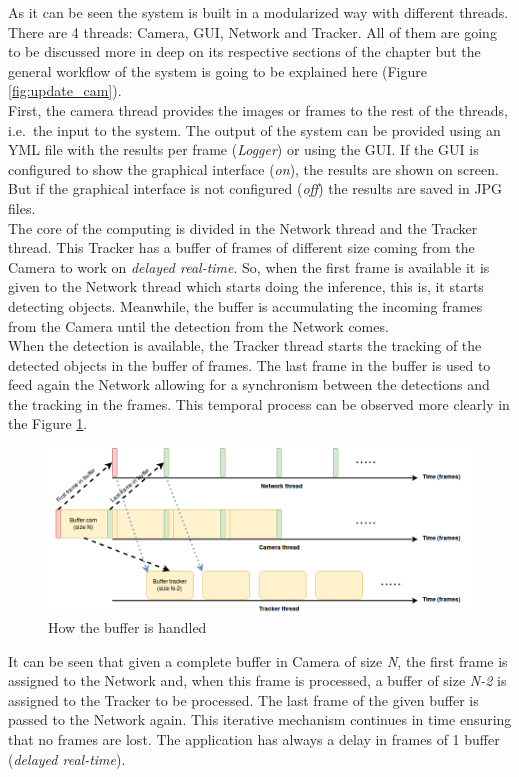 As it can be seen the system is built in a modularized way with different threads. There are 4 threads: Camera, GUI, Network and Tracker. All of them are going to be discussed more in deep on its respective sections of the chapter but the general workflow of the system is going to be explained here (Figure \ref{fig:update_cam}).\\
First, the camera thread provides the images or frames to the rest of the threads, i.e.\ the input to the system. The output of the system can be provided using an YML file with the results per frame (\textit{Logger}) or using the GUI. If the GUI is configured to show the graphical interface (\textit{on}), the results are shown on screen. But if the graphical interface is not configured (\textit{off}) the results are saved in JPG files.\\ The core of the computing is divided in the Network thread and the Tracker thread. This Tracker has a buffer of frames of different size coming from the Camera to work on \textit{delayed real-time}. So, when the first frame is available it is given to the Network thread which starts doing the inference, this is, it starts detecting objects. Meanwhile, the buffer is accumulating the incoming frames from the Camera until the detection from the Network comes.\\
When the detection is available, the Tracker thread starts the tracking of the detected objects in the buffer of frames. The last frame in the buffer is used to feed again the Network allowing for a synchronism between the detections and the tracking in the frames. This temporal process can be observed more clearly in the Figure \ref{fig:buffer}.
\begin{figure}[H]
\begin{center}
\includegraphics[scale=0.4]{figures/buffer.png}
\caption{How the buffer is handled}
\label{fig:buffer}
\end{center}
\end{figure}
It can be seen that given a complete buffer in Camera of size \textit{N}, the first frame is assigned to the Network and, when this frame is processed, a buffer of size \textit{N-2} is assigned to the Tracker to be processed. The last frame of the given buffer is passed to the Network again. This iterative mechanism continues in time ensuring that no frames are lost. The application has always a delay in frames of 1 buffer (\textit{delayed real-time}).
